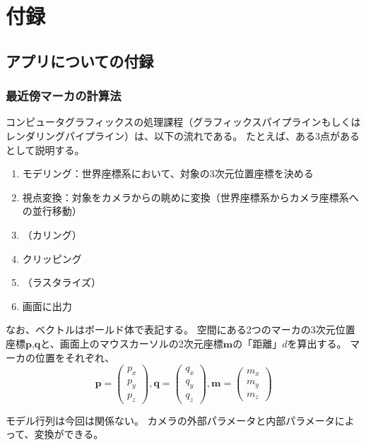 \part*{付録}
\chapter{アプリについての付録}
\section{最近傍マーカの計算法}
コンピュータグラフィックスの処理課程（グラフィックスパイプラインもしくはレンダリングパイプライン）は、以下の流れである。
たとえば、ある3点があるとして説明する。
\begin{enumerate}
  \item モデリング：世界座標系において、対象の3次元位置座標を決める
  \item 視点変換：対象をカメラからの眺めに変換（世界座標系からカメラ座標系への並行移動）
  \item （カリング）
  \item クリッピング
  \item （ラスタライズ）
  \item 画面に出力
\end{enumerate}
なお、ベクトルはボールド体で表記する。
空間にある2つのマーカの3次元位置座標$\bm{p}$,$\bm{ q}$と、画面上のマウスカーソルの2次元座標$\bm{m}$の「距離」$d$を算出する。
マーカの位置をそれぞれ、
$$
  \bm{p} =
  \begin{pmatrix}
    {p_x} \\
    {p_y} \\
    {p_z}
  \end{pmatrix}
  ,
  \bm{q} =
  \begin{pmatrix}
    {q_x} \\
    {q_y} \\
    {q_z}
  \end{pmatrix}
  ,
  \bm{m} =
  \begin{pmatrix}
    {m_x} \\
    {m_y} \\
    {m_z}
  \end{pmatrix}
$$

モデル行列は今回は関係ない。
カメラの外部パラメータと内部パラメータによって、変換ができる。

